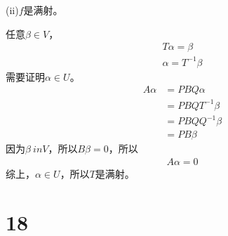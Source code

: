 \documentclass{article}
\begin{document}
\begin{itemize}
        (ii)$f$是满射。

        任意$\beta \in V$，
        \begin{align*}
          T \alpha = \beta \\
          \alpha = T^{-1} \beta
        \end{align*}
        需要证明$\alpha \in U$。
        \begin{align*}
          A \alpha & = PBQ \alpha       \\
                   & = PBQ T^{-1} \beta \\
                   & = PBQ Q^{-1} \beta \\
                   & = P B \beta
        \end{align*}
        因为$\beta \ in V$，所以$B \beta = 0$，所以
        \begin{align*}
          A \alpha = 0
        \end{align*}
        综上，$\alpha \in U$，所以$T$是满射。

\end{itemize}

\section*{18}
\end{document}
